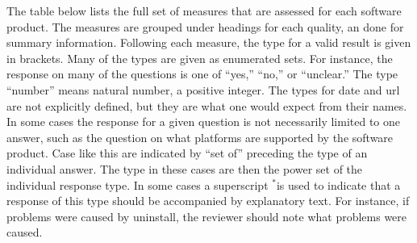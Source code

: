 The table below lists the full set of measures that are assessed for each
software product. The measures are grouped under headings for each quality,
an done for summary information. Following each measure, the type for a valid
result is given in brackets.  Many of the types are given as enumerated sets.
For instance, the response on many of the questions is one of ``yes,'' ``no,''
or ``unclear.'' The type ``number'' means natural number, a positive integer.
The
types for date and url are not explicitly defined, but they are what one would
expect from their names. In some cases the response for a given question is
not necessarily limited to one answer, such as the question on what platforms are
supported by the software product.  Case like this are indicated by ``set of''
preceding the type of an individual answer.  The type in these cases are then
the power set of the individual response type. In some cases a superscript
$^*$is used to indicate that a response of this type should be accompanied by
explanatory text.  For instance, if problems were caused by uninstall, the
reviewer should note what problems were caused.

